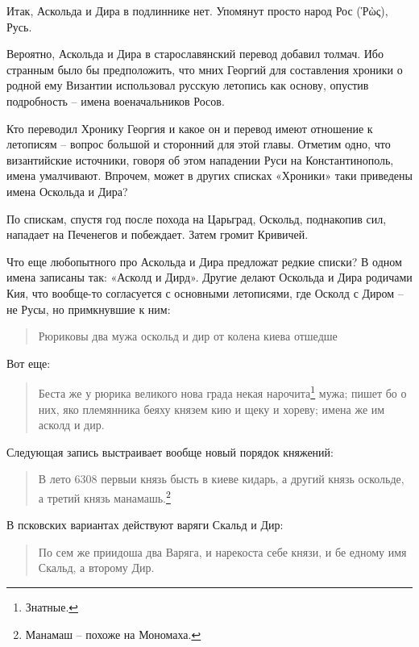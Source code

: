 
Итак, Аскольда и Дира в подлиннике нет. Упомянут просто народ Рос (Ῥὼς), Русь.

Вероятно, Аскольда и Дира в старославянский перевод добавил толмач. Ибо странным было бы предположить, что мних Георгий для составления хроники о родной ему Византии использовал русскую летопись как основу, опустив подробность – имена военачальников Росов.

Кто переводил Хронику Георгия и какое он и перевод имеют отношение к летописям – вопрос большой и сторонний для этой главы. Отметим одно, что византийские источники, говоря об этом нападении Руси на Константинополь, имена умалчивают. Впрочем, может в других списках «Хроники» таки приведены имена Оскольда и Дира?

По спискам, спустя год после похода на Царьград, Оскольд, поднакопив сил, нападает на Печенегов и побеждает. Затем громит Кривичей.

Что еще любопытного про Аскольда и Дира предложат редкие списки? В одном имена записаны так: «Асколд и Дирд». Другие делают Оскольда и Дира родичами Кия, что вообще-то согласуется с основными летописями, где Осколд с Диром – не Русы, но примкнувшие к ним:

\begin{quotation}
Рюриковы два мужа оскольд и дир от колена киева отшедше
\end{quotation}

Вот еще:

\begin{quotation}
Беста же у рюрика великого нова града некая нарочита\footnote{Знатные.} мужа; пишет бо о них, яко племянника беяху князем кию и щеку и хореву; имена же им асколд и дир.
\end{quotation}

Следующая запись выстраивает вообще новый порядок княжений:

\begin{quotation}
В лето 6308 первыи князь бысть в киеве кидарь, а другий князь оскольде, а третий князь манамашь.\footnote{Манамаш – похоже на Мономаха.}
\end{quotation}

В псковских вариантах действуют варяги Скальд и Дир:

\begin{quotation}
По сем же приидоша два Варяга, и нарекоста себе князи, и бе едному имя Скальд, а второму Дир.
\end{quotation}

